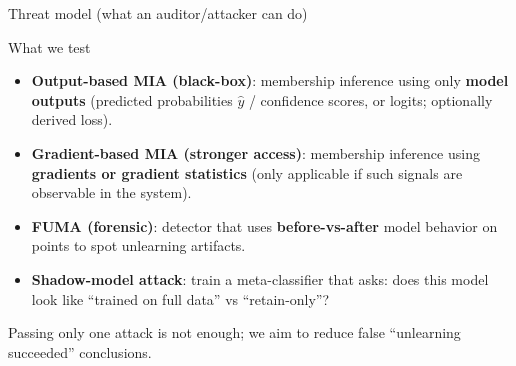 \documentclass[aspectratio=169, 11pt]{beamer}
\begin{document}
\begin{frame}{Threat model (what an auditor/attacker can do)}
  \begin{block}{What we test}
    \begin{itemize}
      \item \textbf{Output-based MIA (black-box)}: membership inference using only \textbf{model outputs}
            (predicted probabilities \(\hat{y}\) / confidence scores, or logits; optionally derived loss).
      \item \textbf{Gradient-based MIA (stronger access)}: membership inference using \textbf{gradients or gradient statistics}
            (only applicable if such signals are observable in the system).
      \item \textbf{FUMA (forensic)}: detector that uses \textbf{before-vs-after} model behavior on points to spot unlearning artifacts.
      \item \textbf{Shadow-model attack}: train a meta-classifier that asks: does this model look like ``trained on full data'' vs ``retain-only''?
    \end{itemize}
  \end{block}
  \vspace{0.4em}
  \small Passing only one attack is not enough; we aim to reduce false ``unlearning succeeded'' conclusions.
\end{frame}
\end{document}
